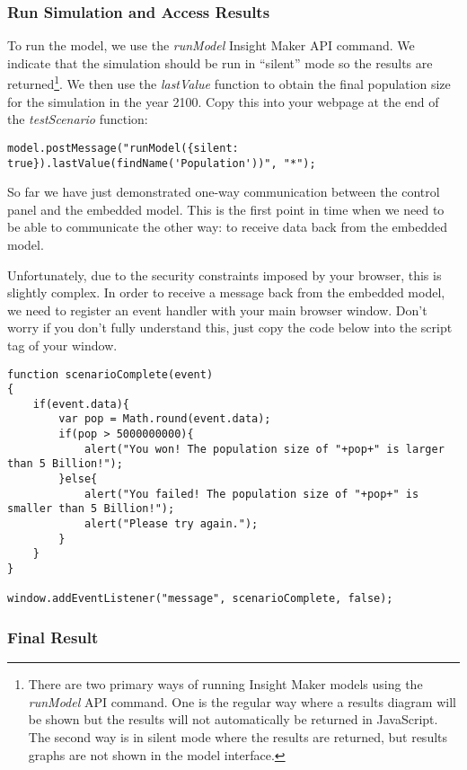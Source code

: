 \documentclass[]{memoir}
\begin{document}
\subsubsection{Run Simulation and Access Results}

To run the model, we use the \emph{runModel} Insight Maker API command.
We indicate that the simulation should be run in ``silent'' mode so the
results are returned\footnote{There are two primary ways of running
  Insight Maker models using the \emph{runModel} API command. One is the
  regular way where a results diagram will be shown but the results will
  not automatically be returned in JavaScript. The second way is in
  silent mode where the results are returned, but results graphs are not
  shown in the model interface.}. We then use the \emph{lastValue}
function to obtain the final population size for the simulation in the
year 2100. Copy this into your webpage at the end of the
\emph{testScenario} function:

\begin{lstlisting}
model.postMessage("runModel({silent: true}).lastValue(findName('Population'))", "*");
\end{lstlisting}

So far we have just demonstrated one-way communication between the
control panel and the embedded model. This is the first point in time
when we need to be able to communicate the other way: to receive data
back from the embedded model.

Unfortunately, due to the security constraints imposed by your browser,
this is slightly complex. In order to receive a message back from the
embedded model, we need to register an event handler with your main
browser window. Don't worry if you don't fully understand this, just
copy the code below into the script tag of your window.

\begin{lstlisting}
function scenarioComplete(event)
{
    if(event.data){
        var pop = Math.round(event.data);
        if(pop > 5000000000){
            alert("You won! The population size of "+pop+" is larger than 5 Billion!");
        }else{
            alert("You failed! The population size of "+pop+" is smaller than 5 Billion!");
            alert("Please try again.");
        }
    }
}

window.addEventListener("message", scenarioComplete, false);
\end{lstlisting}

\subsubsection{Final Result}
\end{document}
